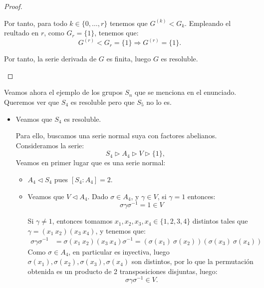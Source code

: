 \begin{ejercicio}
\begin{prop}
\begin{proof}
\begin{description}
                Por tanto, para todo \(k\in \{0, \ldots, r\}\) tenemos que \(G^{(k)} < G_k\). Empleando el reultado en $r$, como \(G_r = \{1\}\), tenemos que:
                \begin{equation*}
                    G^{(r)} < G_r = \{1\}\Longrightarrow G^{(r)} = \{1\}.
                \end{equation*}

                Por tanto, la serie derivada de \(G\) es finita, luego \(G\) es resoluble.
            \end{description}
        \end{proof}
    \end{prop}

    Veamos ahora el ejemplo de los grupos \(S_n\) que se menciona en el enunciado.
    Queremos ver que \(S_4\) es resoluble pero que \(S_5\) no lo es.
    \begin{itemize}
        \item Veamos que \(S_4\) es resoluble.
        
        Para ello, buscamos una serie normal suya con factores abelianos. Consideramos la serie:
        \begin{equation*}
            S_4 \rhd A_4 \rhd V \rhd \{1\},
        \end{equation*}
        Veamos en primer lugar que es una serie normal:
        \begin{itemize}
            \item \(A_4\lhd S_4\) pues $[S_4: A_4] = 2$.
            \item Veamos que \(V\lhd A_4\). Dado $\sigma\in A_4$, y \(\gamma\in V\), si $\gamma=1$ entonces:
            $$\sigma\gamma\sigma^{-1} = 1\in V$$

            Si $\gamma\neq 1$, entonces tomamos $x_1, x_2,x_3,x_4\in \{1,2,3,4\}$ distintos tales que $\gamma = (x_1\ x_2)(x_3\ x_4)$, y tenemos que:
            \begin{align*}
                \sigma\gamma\sigma^{-1} &= \sigma(x_1\ x_2)(x_3\ x_4)\sigma^{-1}
                = (\sigma(x_1)\ \sigma(x_2))(\sigma(x_3)\ \sigma(x_4))
            \end{align*}
            Como $\sigma\in A_4$, en particular es inyectiva, luego $\sigma(x_1), \sigma(x_2), \sigma(x_3), \sigma(x_4)$ son distintos, por lo que la permutación obtenida es un producto de 2 transposiciones disjuntas, luego:
            \begin{equation*}
                \sigma\gamma\sigma^{-1} \in V.
            \end{equation*}


\end{itemize}
\end{itemize}
\end{ejercicio}
